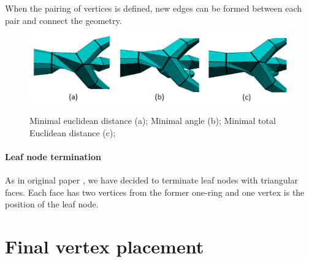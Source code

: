 When the pairing of vertices is defined, new edges can be formed between each pair and connect the geometry.

\begin{figure}[h]
    \centering
    \includegraphics[width=\textwidth]{images/join_pairing.png}
    \label{fig:join_pairing_ilu}
    \caption[BNP joining pairing]{Minimal euclidean distance (a); Minimal angle (b); Minimal total Euclidean distance (c);}
\end{figure}

\paragraph{Leaf node termination}
As in original paper \cite{sqm}, we have decided to terminate leaf nodes with triangular faces. Each face has two vertices from the former one-ring and one vertex is the position of the leaf node.

\section{Final vertex placement}